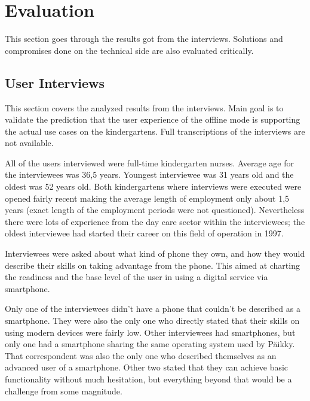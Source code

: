 \chapter{Evaluation}

This section goes through the results got from the interviews. Solutions and compromises done on the technical side are also evaluated critically.


\section{User Interviews}


This section covers the analyzed results from the interviews. Main goal is to validate the prediction that the user experience of the offline mode is supporting the actual use cases on the kindergartens. Full transcriptions of the interviews are not available.

All of the users interviewed were full-time kindergarten nurses. Average age for the interviewees was 36,5 years. Youngest interviewee was 31 years old and the oldest was 52 years old. Both kindergartens where interviews were executed were opened fairly recent making the average length of employment only about 1,5 years (exact length of the employment periods were not questioned). Nevertheless there were lots of experience from the day care sector within the interviewees; the oldest interviewee had started their career on this field of operation in 1997.

Interviewees were asked about what kind of phone they own, and how they would describe their skills on taking advantage from the phone. This aimed at charting the readiness and the base level of the user in using a digital service via smartphone. 

Only one of the interviewees didn't have a phone that couldn't be described as a smartphone. They were also the only one who directly stated that their skills on using modern devices were fairly low. Other interviewees had smartphones, but only one had a smartphone sharing the same operating system used by Päikky. That correspondent was also the only one who described themselves as an advanced user of a smartphone. Other two stated that they can achieve basic functionality without much hesitation, but everything beyond that would be a challenge from some magnitude. 

